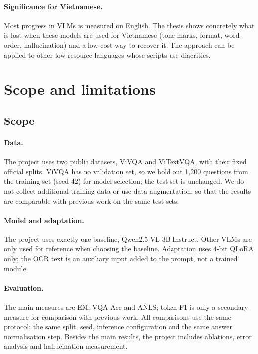 \paragraph{Significance for Vietnamese.} Most progress in VLMs is measured on English.
The thesis shows concretely what is lost when these models are used for Vietnamese
(tone marks, format, word order, hallucination) and a low-cost way to recover it. The
approach can be applied to other low-resource languages whose scripts use diacritics.

\section{Scope and limitations}
\label{sec:intro-scope}

\subsection{Scope}

\paragraph{Data.} The project uses two public datasets, ViVQA and ViTextVQA, with
their fixed official splits. ViVQA has no validation set, so we hold out
1,200 questions from the training set (seed 42) for model selection; the test set is
unchanged. We do not collect additional training data or use data
augmentation, so that the results are comparable with previous work on the same test
sets.

\paragraph{Model and adaptation.} The project uses exactly one baseline,
Qwen2.5-VL-3B-Instruct. Other VLMs are only used for reference when choosing the
baseline. Adaptation uses 4-bit QLoRA only; the OCR text is an auxiliary input added
to the prompt, not a trained module.

\paragraph{Evaluation.} The main measures are EM, VQA-Acc and ANLS; token-F1 is only a
secondary measure for comparison with previous work. All comparisons use the same
protocol: the same split, seed, inference configuration and the same answer
normalisation step. Besides the main results, the project includes ablations, error
analysis and hallucination measurement.

